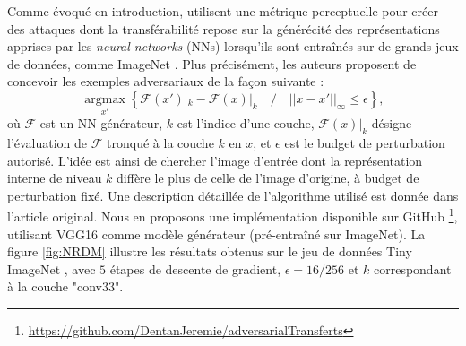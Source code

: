 \documentclass{article}
\DeclareMathOperator*{\argmax}{argmax}
\begin{document}
Comme évoqué en introduction, \citet{Naseer2018TaskgeneralizableAA} utilisent une métrique perceptuelle pour créer des attaques dont la transférabilité repose sur la générécité des représentations apprises par les \textit{neural networks} (NNs) lorsqu'ils sont entraînés sur de grands jeux de données, comme ImageNet \cite{Russakovsky2014ImageNetLS}. Plus précisément, les auteurs proposent de concevoir les exemples adversariaux de la façon suivante : $$\argmax\limits_{x'} \left\{\mathcal{F}(x')|_k - \mathcal{F}(x)|_k \quad / \quad ||x-x'||_{\infty} \le \epsilon \right\},$$
où $\mathcal{F}$ est un NN générateur, $k$ est l'indice d'une couche, $\mathcal{F}(x)|_k$ désigne l'évaluation de $\mathcal{F}$ tronqué à la couche $k$ en $x$, et $\epsilon$ est le budget de perturbation autorisé. L'idée est ainsi de chercher l'image d'entrée dont la représentation interne de niveau $k$ diffère le plus de celle de l'image d'origine, à budget de perturbation fixé. Une description détaillée de l'algorithme utilisé est donnée dans l'article original. Nous en proposons une implémentation disponible sur GitHub \footnote{\url{https://github.com/DentanJeremie/adversarialTransferts}}, utilisant VGG16 \cite{Simonyan2014VeryDC} comme modèle générateur (pré-entraîné sur ImageNet). La figure \ref{fig:NRDM} illustre les résultats obtenus sur le jeu de données Tiny ImageNet \cite{Le2015TinyIV}, avec $5$ étapes de descente de gradient, $\epsilon = 16/256$ et $k$ correspondant à la couche "conv33".\\
\end{document}

